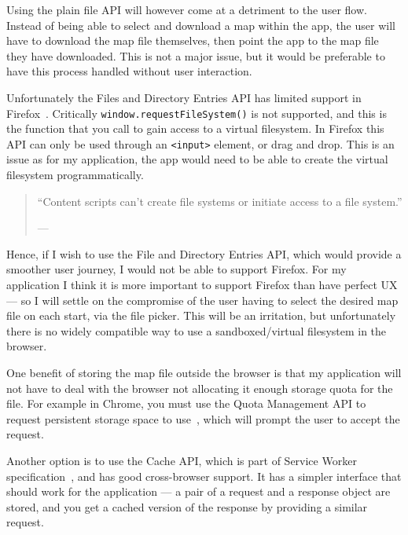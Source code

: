 \documentclass[]{final_report}
\begin{document}
Using the plain file API will however come at a detriment to the user flow. Instead of being able to select and download a map within the app, the user will have to download the map file themselves, then point the app to the map file they have downloaded. This is not a major issue, but it would be preferable to have this process handled without user interaction.

Unfortunately the Files and Directory Entries API has limited support in Firefox~\cite{mdn-file-directories-api-limitations}. Critically \texttt{window.requestFileSystem()} is not supported, and this is the function that you call to gain access to a virtual filesystem. In Firefox this API can only be used through an \texttt{<input>} element, or drag and drop. This is an issue as for my application, the app would need to be able to create the virtual filesystem programmatically.

\begin{quote}
    ``Content scripts can't create file systems or initiate access to a file system.''

    \footnotesize{--- }
\end{quote}

Hence, if I wish to use the File and Directory Entries API, which would provide a smoother user journey, I would not be able to support Firefox. For my application I think it is more important to support Firefox than have perfect UX --- so I will settle on the compromise of the user having to select the desired map file on each start, via the file picker. This will be an irritation, but unfortunately there is no widely compatible way to use a sandboxed/virtual filesystem in the browser.

One benefit of storing the map file outside the browser is that my application will not have to deal with the browser not allocating it enough storage quota for the file. For example in Chrome, you must use the Quota Management API to request persistent storage space to use~\cite{gd-offline-html5-storage}, which will prompt the user to accept the request.

Another option is to use the Cache API, which is part of Service Worker specification~\cite{w3c-service-workers-caches}, and has good cross-browser support. It has a simpler interface that should work for the application --- a pair of a request and a response object are stored, and you get a cached version of the response by providing a similar request. 
\end{document}
